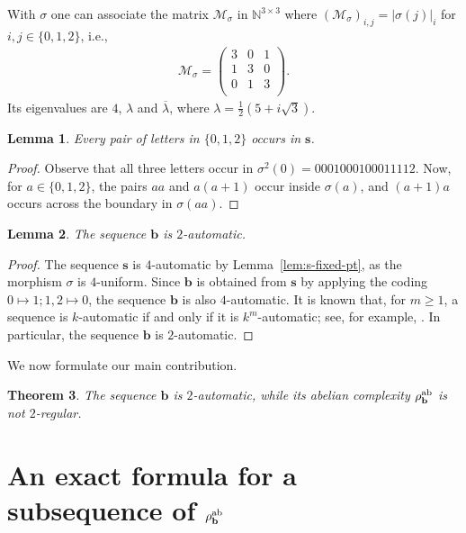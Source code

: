 \documentclass[12pt]{article}
\theoremstyle{plain}
\newtheorem{theorem}{Theorem}
\newtheorem{lemma}[theorem]{Lemma}
\theoremstyle{definition}
\theoremstyle{remark}
\newcommand{\N}{\mathbb{N}}
\numberwithin{equation}{section}
\begin{document}
With $\sigma$ one can associate the matrix $\mathcal{M}_\sigma$ in $\N^{3\times 3}$ where $(\mathcal{M}_\sigma)_{i,j}=\lvert\sigma(j)\rvert_i$ for $i,j\in\{0,1,2\}$, i.e.,
\begin{align}
\label{eq:matrix-sigma}
\mathcal{M}_\sigma=\begin{pmatrix}
    3& 0& 1\\ 1& 3 & 0\\ 0& 1& 3\\
\end{pmatrix}.
\end{align}
Its eigenvalues are $4$, $\lambda$ and $\overline{\lambda}$, where $\lambda=\frac{1}{2} \left(5+ i \sqrt{3}\right)$.

\begin{lemma}
\label{lem:pair-of-letters}
Every pair of letters in $\{0,1,2\}$ occurs in $\mathbf{s}$.
\end{lemma}
\begin{proof}
Observe that all three letters occur in $\sigma^2(0)=0001000100011112$.
Now, for $a\in\{0,1,2\}$, the pairs
$aa$ and $a(a+1)$ occur inside $\sigma(a)$, and $(a+1)a$
occurs across the boundary in $\sigma(aa)$.
\end{proof}





\begin{lemma}
\label{lem:b-2auto}
The sequence $\mathbf{b}$ is $2$-automatic.
\end{lemma}
\begin{proof}
The sequence $\mathbf{s}$ is $4$-automatic by Lemma~\ref{lem:s-fixed-pt}, as the morphism $\sigma$ is $4$-uniform.
Since $\mathbf{b}$ is obtained from $\mathbf{s}$ by applying the coding $0\mapsto 1; 1,2\mapsto 0$, the sequence $\mathbf{b}$ is also $4$-automatic. 
It is known that, for $m \geq 1$, a sequence is $k$-automatic 
if and only if it is $k^m$-automatic; see, for example,
\cite[Thm.~6.6.4]{Allouche&Shallit:2003}.
In particular, the sequence 
$\mathbf{b}$ is $2$-automatic.
\end{proof}

We now formulate our main contribution.

\begin{theorem}\label{thm:main}
The sequence $\mathbf{b}$ is $2$-automatic, while its abelian complexity $\rho_{\mathbf{b}}^{\rm ab}$ is not $2$-regular.
\end{theorem}

\section{An exact formula for a subsequence of
\texorpdfstring{$\rho_{\mathbf{b}}^{\rm ab}$}{rho b ab}}
\end{document}

